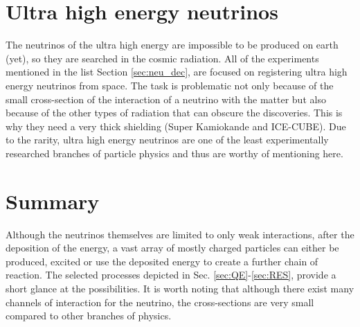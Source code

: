 \section{Ultra high energy neutrinos}

The neutrinos of the ultra high energy are impossible to be produced on earth (yet), so they are searched in the cosmic radiation. All of the experiments mentioned in the list Section \ref{sec:neu_dec}, are focused on registering ultra high energy neutrinos from space. The task is problematic not only because of the small cross-section of the interaction of a neutrino with the matter but also because of the other types of radiation that can obscure the discoveries. This is why they need a very thick shielding (Super Kamiokande and ICE-CUBE).
Due to the rarity, ultra high energy neutrinos are one of the least experimentally researched branches of particle physics and thus are worthy of mentioning here.


\section{Summary}

Although the neutrinos themselves are limited to only weak interactions, after the deposition of the energy, a vast array of mostly charged particles can either be produced, excited or use the deposited energy to create a further chain of reaction.
The selected processes depicted in Sec. \ref{sec:QE}-\ref{sec:RES}, provide a short glance at the possibilities.
It is worth noting that although there exist many channels of interaction for the neutrino, the cross-sections are very small compared to other branches of physics.


